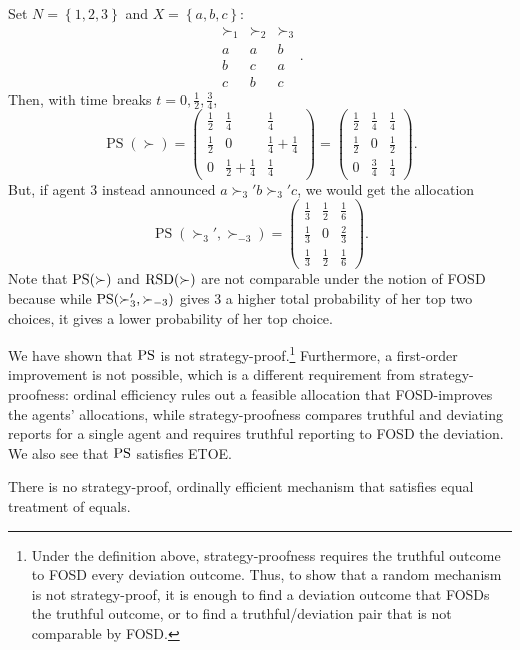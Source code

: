 \begin{example}
	Set $N = \left\{1,2,3\right\}$ and $X = \left\{a,b,c\right\}$:
	\[
		\begin{array}{ccc}
			\succ_1 & \succ_2 & \succ_3 \\
			\hline
			a & a & b \\
			b & c & a \\
			c & b & c
		\end{array}
	.\]
	Then, with time breaks $t=0,\frac{1}{2},\frac{3}{4}$,
	\[
		\operatorname{PS}(\succ)
		=
		\left(
		\begin{array}{ccc}
			\frac{1}{2} & \frac{1}{4} & \frac{1}{4} \\[0.45em]
			\frac{1}{2} & 0 & \frac{1}{4} + \frac{1}{4}\\[0.45em]
			0 & \frac{1}{2} + \frac{1}{4} & \frac{1}{4}
		\end{array}
		\right)
		=
		\left(
		\begin{array}{ccc}
			\frac{1}{2} & \frac{1}{4} & \frac{1}{4} \\[0.45em]
			\frac{1}{2} & 0 & \frac{1}{2}\\[0.45em]
			0 & \frac{3}{4} & \frac{1}{4}
		\end{array}
		\right)
	.\]
	But, if agent $3$ instead announced $a \succ_{3}' b \succ_{3}' c$,
	we would get the allocation
	\[
		\operatorname{PS}(\succ_3', \succ_{-3})
		=
		\left(
		\begin{array}{ccc}
			\frac{1}{3} & \frac{1}{2} & \frac{1}{6} \\[0.45em]
			\frac{1}{3} & 0 & \frac{2}{3} \\[0.45em]
			\frac{1}{3} & \frac{1}{2} & \frac{1}{6}
		\end{array}
		\right)
	.\]
	Note that $\operatorname{PS}(\succ)$ and $\operatorname{RSD}(\succ)$ are not comparable under the notion of FOSD because while $\operatorname{PS}(\succ_{3}',\succ_{-3})$ gives 3 a higher total probability of her top two choices, it gives a lower probability of her top choice.

\end{example}

We have shown that $\operatorname{PS}$ is not strategy-proof.\footnote{Under the definition above, strategy-proofness requires the truthful outcome to FOSD every deviation outcome. Thus, to show that a random mechanism is not strategy-proof, it is enough to find a deviation outcome that FOSDs the truthful outcome, or to find a truthful/deviation pair that is not comparable by FOSD.} Furthermore, a first-order improvement is not possible, which is a different requirement from strategy-proofness: ordinal efficiency rules out a feasible allocation that FOSD-improves the agents' allocations, while strategy-proofness compares truthful and deviating reports for a single agent and requires truthful reporting to FOSD the deviation.
We also see that $\operatorname{PS}$ satisfies ETOE.

\begin{theorem}
	There is no strategy-proof, ordinally efficient mechanism that satisfies equal treatment of equals.
\end{theorem}
